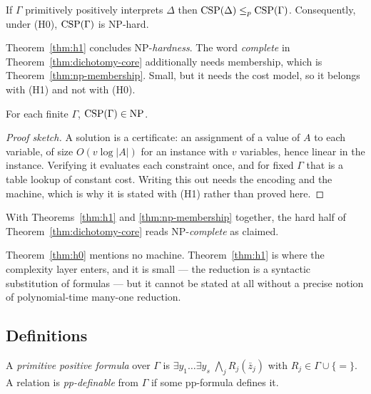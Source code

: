 \begin{theorem}\label{thm:h1}
If $\Gamma$ primitively positively interprets $\Delta$ then
$\operatorname{CSP}(\Delta)\le_{p}\operatorname{CSP}(\Gamma)$. Consequently, under \textup{(H0)},
$\operatorname{CSP}(\Gamma)$ is \textup{NP}-hard.
\end{theorem}

\begin{hazard}\label{haz:np-membership}
Theorem~\ref{thm:h1} concludes \textup{NP}-\emph{hardness}. The word
\emph{complete} in Theorem~\ref{thm:dichotomy-core} additionally needs
membership, which is Theorem~\ref{thm:np-membership}. Small, but it needs the
cost model, so it belongs with \textup{(H1)} and not with \textup{(H0)}.
\end{hazard}

\begin{theorem}\label{thm:np-membership}
For each finite $\Gamma$, $\operatorname{CSP}(\Gamma)\in\textup{NP}$.
\end{theorem}

\begin{proof}[Proof sketch]
A solution is a certificate: an assignment of a value of $A$ to each variable,
of size $O(v\log|A|)$ for an instance with $v$ variables, hence linear in the
instance. Verifying it evaluates each constraint once, and for fixed $\Gamma$
that is a table lookup of constant cost. Writing this out needs the encoding
and the machine, which is why it is stated with \textup{(H1)} rather than
proved here.
\end{proof}

With Theorems~\ref{thm:h1} and \ref{thm:np-membership} together, the hard half
of Theorem~\ref{thm:dichotomy-core} reads \textup{NP}-\emph{complete} as
claimed.

Theorem~\ref{thm:h0} mentions no machine. Theorem~\ref{thm:h1} is where the
complexity layer enters, and it is small --- the reduction is a syntactic
substitution of formulas --- but it cannot be stated at all without a precise
notion of polynomial-time many-one reduction.

\subsection{Definitions}

\begin{definition}\label{def:pp}
A \emph{primitive positive formula} over $\Gamma$ is
$\exists y_{1}\dots\exists y_{s}\;\bigwedge_{j}R_{j}(\bar z_{j})$ with
$R_{j}\in\Gamma\cup\{=\}$. A relation is \emph{pp-definable} from $\Gamma$ if
some pp-formula defines it.
\end{definition}

